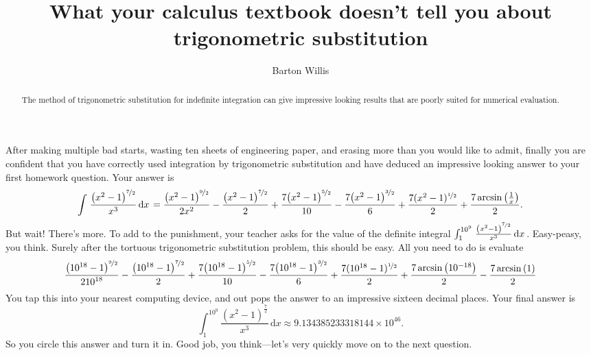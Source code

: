 \documentclass[12pt,fleqn]{article}
\title{What your calculus textbook doesn't tell you about trigonometric substitution}
\author{Barton Willis}
\newcounter{ex}\setcounter{ex}{0}
\begin{document}
\maketitle

\begin{abstract} The method of trigonometric substitution for indefinite
  integration can give impressive looking results that are poorly suited for 
  numerical evaluation.
\end{abstract}

After making multiple bad starts, wasting ten sheets of engineering paper, 
 and erasing more  than you would like to admit, finally you are confident 
 that you have correctly used integration by trigonometric substitution and have
 deduced an impressive looking answer to your first homework question. Your answer
 is
 \begin{equation*}
    \int {\left. \frac{{{\left( {{x}^{2}}-1\right) }^{\nicefrac{7}{2}}}}{{{x}^{3}}} \, \mathrm{d}x\right.}=\frac{{{\left( {{x}^{2}}-1\right) }^{\nicefrac{9}{2}}}}{2 {{x}^{2}}}-\frac{{{\left( {{x}^{2}}-1\right) }^{\nicefrac{7}{2}}}}{2}+\frac{7 {{\left( {{x}^{2}}-1\right) }^{\nicefrac{5}{2}}}}{10}-\frac{7 {{\left( {{x}^{2}}-1\right) }^{\nicefrac{3}{2}}}}{6}+\frac{7 (x^2-1)^{\nicefrac{1}{2}}}{2}+\frac{7 \operatorname{arcsin}\left( \frac{1}{x}\right) }{2}.
\end{equation*}
But wait! There's more. To add to the punishment, your teacher asks for the value of  
the definite integral $\int_1^{10^9} {\left. \frac{{{\left( {{x}^{2}}-1\right) }^{\nicefrac{7}{2}}}}{{{x}^{3}}} \, \mathrm{d}x\right.}$. Easy-peasy, you think.
Surely after the tortuous trigonometric substitution problem, this should be easy. 
All you need to do is evaluate
\begin{equation*}
  \frac{{{\left( {{10}^{18}}-1\right) }^{\nicefrac{9}{2}}}}{2 {{10}^{18}}}-\frac{{{\left( {{10}^{18}}-1\right) }^{\nicefrac{7}{2}}}}{2}+\frac{7 {{\left( {{10}^{18}}-1\right) }^{\nicefrac{5}{2}}}}{10}-\frac{7 {{\left( {{10}^{18}}-1\right) }^{\nicefrac{3}{2}}}}{6}+\frac{7 (10^{18}-1)^{\nicefrac{1}{2}}}{2}+\frac{7 \operatorname{arcsin}\left( 10^{-18}\right) }{2}
    - \frac{7 \operatorname{arcsin}\left( 1 \right) }{2}
\end{equation*}
You tap this into your nearest computing device, and out  pops the answer to an 
impressive sixteen decimal places. Your final answer is
\begin{equation*}
    \int_1^{10^9} {\left. \frac{{{\left( {{x}^{2}}-1\right) }^{\frac{7}{2}}}}{{{x}^{3}}} \, \mathrm{d}x\right.}
       \approx 9.134385233318144 \times {{10}^{46}}.
\end{equation*}
So you circle this answer and turn it in. Good job, you think---let's very quickly move on to the 
next question.
\end{document}
